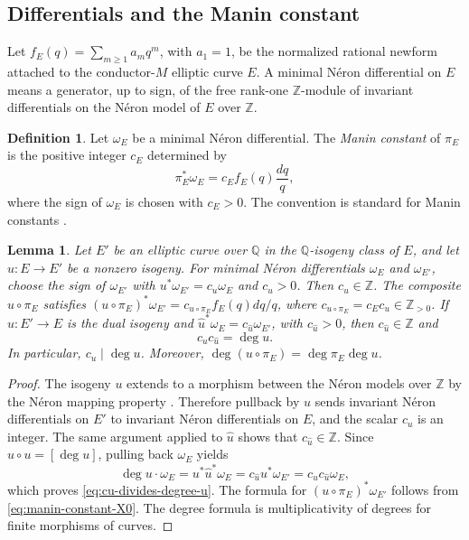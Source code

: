 \documentclass[12pt, letterpaper]{amsart}
\newtheorem{lemma}[theorem]{Lemma}
\theoremstyle{definition}
\newtheorem{definition}[theorem]{Definition}
\theoremstyle{remark}
\newcommand{\Q}{\mathbb Q}
\newcommand{\Z}{\mathbb Z}
\numberwithin{equation}{section}
\begin{document}
\subsection{Differentials and the Manin constant}

Let \(f_E(q)=\sum_{m\ge1}a_mq^m\), with \(a_1=1\), be the normalized rational
newform attached to the conductor-\(M\) elliptic curve \(E\). A minimal
N\'eron differential on \(E\) means a generator, up to sign, of the free
rank-one \(\Z\)-module of invariant differentials on the N\'eron model of \(E\)
over \(\Z\).

\begin{definition}\label{def:manin-constant}
Let \(\omega_E\) be a minimal N\'eron differential. The \emph{Manin constant} of
\(\pi_E\) is the positive integer \(c_E\) determined by
\begin{equation}\label{eq:manin-constant-X0}
        \pi_E^*\omega_E=c_E f_E(q)\frac{dq}{q},
\end{equation}
where the sign of \(\omega_E\) is chosen with \(c_E>0\). The convention is
standard for Manin constants \cite{AgasheRibetStein,CesnaviciusNeururerSaha}.
\end{definition}

\begin{lemma}\label{lem:fixed-target-manin}
Let \(E'\) be an elliptic curve over \(\Q\) in the \(\Q\)-isogeny class of
\(E\), and let \(u:E\to E'\) be a nonzero isogeny. For minimal N\'eron
differentials \(\omega_E\) and \(\omega_{E'}\), choose the sign of
\(\omega_{E'}\) with \(u^*\omega_{E'}=c_u\omega_E\) and \(c_u>0\).
Then \(c_u\in\Z\). The composite \(u\circ\pi_E\) satisfies
\((u\circ\pi_E)^*\omega_{E'}=c_{u\circ\pi_E}f_E(q)dq/q\), where
\(c_{u\circ\pi_E}=c_Ec_u\in\Z_{>0}\).
If \(\widehat u:E'\to E\) is the dual isogeny and
\(\widehat u^*\omega_E=c_{\widehat u}\omega_{E'}\), with
\(c_{\widehat u}>0\), then \(c_{\widehat u}\in\Z\) and
\begin{equation}\label{eq:cu-divides-degree-u}
        c_uc_{\widehat u}=\deg u.
\end{equation}
In particular, \(c_u\mid\deg u\). Moreover, \(\deg(u\circ\pi_E)=\deg\pi_E\deg u\).
\end{lemma}

\begin{proof}
The isogeny \(u\) extends to a morphism between the N\'eron models over
\(\Z\) by the N\'eron mapping property \cite{BLR}.
Therefore pullback by \(u\) sends invariant N\'eron differentials on \(E'\) to
invariant N\'eron differentials on \(E\), and the scalar \(c_u\) is an integer.
The same argument applied to \(\widehat u\) shows that
\(c_{\widehat u}\in\Z\). Since \(\widehat u\circ u=[\deg u]\), pulling back
\(\omega_E\) yields
\[
        \deg u\cdot\omega_E
        =
        u^*\widehat u^*\omega_E
        =
        c_{\widehat u}u^*\omega_{E'}
        =
        c_uc_{\widehat u}\omega_E,
\]
which proves \eqref{eq:cu-divides-degree-u}.
The formula for \((u\circ\pi_E)^*\omega_{E'}\) follows from
\eqref{eq:manin-constant-X0}. The degree formula is multiplicativity of degrees
for finite morphisms of curves.
\end{proof}
\end{document}
